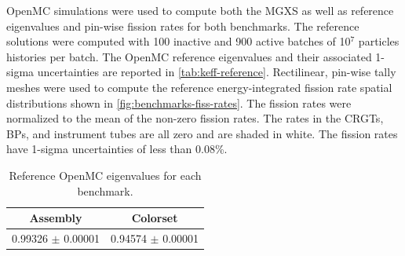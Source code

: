 OpenMC simulations were used to compute both the MGXS as well as reference eigenvalues and pin-wise fission rates for both benchmarks. The reference solutions were computed with 100 inactive and 900 active batches of 10$^7$ particles histories per batch. The OpenMC reference eigenvalues and their associated 1-sigma uncertainties are reported in \autoref{tab:keff-reference}. Rectilinear, pin-wise tally meshes were used to compute the reference energy-integrated fission rate spatial distributions shown in \autoref{fig:benchmarks-fiss-rates}. The fission rates were normalized to the mean of the non-zero fission rates. The rates in the CRGTs, BPs, and instrument tubes are all zero and are shaded in white. The fission rates have 1-sigma uncertainties of less than 0.08\%.

\begin{table}[h!]
  \centering
  \caption{Reference OpenMC eigenvalues for each benchmark.}
  \label{tab:keff-reference} 
  \begin{tabular}{c c}
  \toprule
  {\bf Assembly} &
  {\bf Colorset} \\
  \midrule
  0.99326 $\pm$ 0.00001 & 0.94574 $\pm$ 0.00001 \\
  \bottomrule
\end{tabular}
\end{table}

